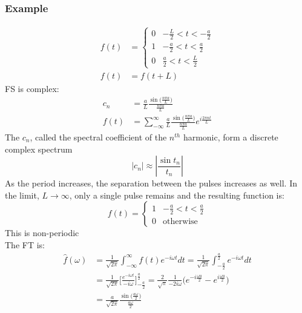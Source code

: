 \documentclass[a4paper, 11pt, normalem]{report}
\newcommand\ifnt{\int_{-\infty}^{\infty}}
\newcommand\ifsum{\sum_{-\infty}^{\infty}}
\newcommand\om{\omega}
\begin{document}
\subsection{Example}
\begin{align*}
    f(t) &=
    \begin{cases}
        0 & -\frac{L}{2} < t < -\frac{a}{2} \\
        1 & -\frac{a}{2} < t < \frac{a}{2}  \\
        0 & \frac{a}{2} < t < \frac{L}{2}
    \end{cases} \\
    f(t) &= f(t + L)
\end{align*}
FS is complex:
\begin{align*}
    c_n &= \frac{a}{L} \frac{\sin\big(\tfrac{n\pi a}{L}\big)}{\tfrac{n\pi a}{L}} \\
    f(t) &= \ifsum \frac{a}{L} \frac{\sin\big(\tfrac{n\pi a}{L}\big)}{\tfrac{n\pi a}{L}} e^{i\tfrac{2\pi nt}{L}}
\end{align*}
The $c_n$, called the spectral coefficient of the $n^{th}$ harmonic, form a discrete complex spectrum
\begin{equation*}
    |c_n| \approx |\frac{\sin t_n}{t_n}|
\end{equation*}
As the period increases, the separation between the pulses increases as well. In the limit, $L \to \infty$, only a single pulse remains and the resulting function is:
\begin{equation*}
    f(t) =
    \begin{cases}
        1 & -\frac{a}{2} < t < \frac{a}{2} \\
        0 & \text{otherwise}
    \end{cases}
\end{equation*}
This is non-periodic \\
The FT is:
\begin{align*}
    \hat{f}(\om) &= \frac{1}{\sqrt{2\pi}} \ifnt f(t)e^{-i\om t}dt = \frac{1}{\sqrt{2\pi}} \int_{-\tfrac{a}{2}}^{\tfrac{a}{2}} e^{-i\om t}dt \\
    &= \frac{1}{\sqrt{2\pi}} \Bigg[\frac{e^{-i\om t}}{-i\om} \Bigg]_{-\tfrac{a}{2}}^{\tfrac{a}{2}} = \frac{2}{\sqrt{\pi}} \frac{1}{-2i\om} \Big(e^{-i\tfrac{\om a}{2}} - e^{i\tfrac{\om a}{2}}\Big) \\
    &= \frac{a}{\sqrt{2\pi}} \frac{\sin\big(\tfrac{a\om}{2}\big)}{\tfrac{a\om}{2}}
\end{align*}

\chapter{}
\end{document}
